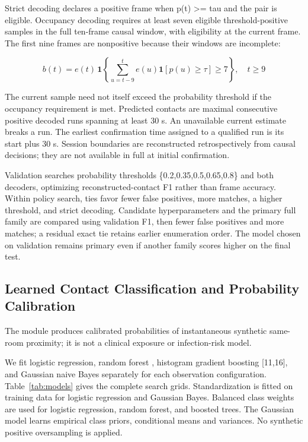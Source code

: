 \documentclass[12pt,a4paper]{report}
\begin{document}
Strict decoding declares a positive frame when p(t) >= tau and the pair is eligible. Occupancy decoding requires at least seven eligible threshold-positive samples in the full ten-frame causal window, with eligibility at the current frame. The first nine frames are nonpositive because their windows are incomplete:

\begin{equation}
b(t)=e(t)\,\mathbf{1}\!\left\{\sum_{u=t-9}^{t}e(u)\mathbf{1}[p(u)\geq\tau]\geq7\right\},\quad t\geq9
\label{eq:source8}
\end{equation}

The current sample need not itself exceed the probability threshold if the occupancy requirement is met. Predicted contacts are maximal consecutive positive decoded runs spanning at least 30 s. An unavailable current estimate breaks a run. The earliest confirmation time assigned to a qualified run is its start plus 30 s. Session boundaries are reconstructed retrospectively from causal decisions; they are not available in full at initial confirmation.

Validation searches probability thresholds \{0.2,0.35,0.5,0.65,0.8\} and both decoders, optimizing reconstructed-contact F1 rather than frame accuracy. Within policy search, ties favor fewer false positives, more matches, a higher threshold, and strict decoding. Candidate hyperparameters and the primary full family are compared using validation F1, then fewer false positives and more matches; a residual exact tie retains earlier enumeration order. The model chosen on validation remains primary even if another family scores higher on the final test.

\subsection{Learned Contact Classification and Probability Calibration}
The module produces calibrated probabilities of instantaneous synthetic same-room proximity; it is not a clinical exposure or infection-risk model.

We fit logistic regression, random forest \cite{ref15}, histogram gradient boosting [11,16], and Gaussian naive Bayes separately for each observation configuration. Table~\ref{tab:models} gives the complete search grids. Standardization is fitted on training data for logistic regression and Gaussian Bayes. Balanced class weights are used for logistic regression, random forest, and boosted trees. The Gaussian model learns empirical class priors, conditional means and variances. No synthetic positive oversampling is applied.
\end{document}
